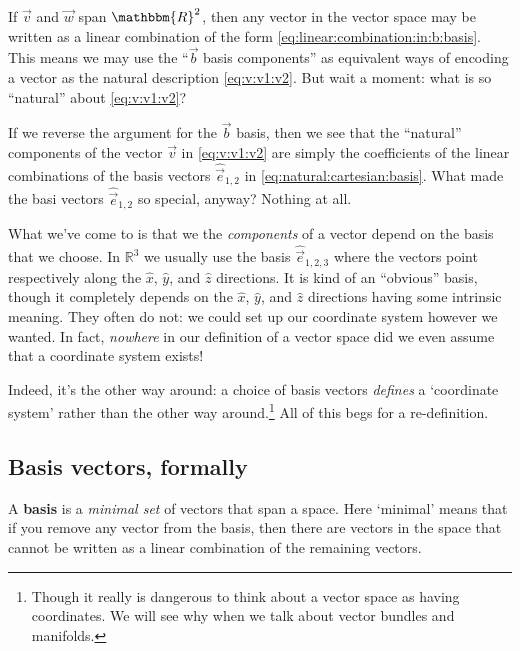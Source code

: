 \documentclass[12pt]{article}
\begin{document}
If $\vec{v}$ and $\vec{w}$ span $\mathbbm{R}^2$, then any vector in the vector space may be written as a linear combination of the form \eqref{eq:linear:combination:in:b:basis}. This means we may use the ``$\vec{b}$ basis components'' as equivalent ways of encoding a vector as the natural description \eqref{eq:v:v1:v2}. But wait a moment: what is so ``natural'' about \eqref{eq:v:v1:v2}? 

If we reverse the argument for the $\vec{b}$ basis, then we see that the ``natural'' components of the vector $\vec{v}$ in \eqref{eq:v:v1:v2} are simply the coefficients of the linear combinations of the basis vectors $\hat{\vec{e}}_{1,2}$ in \eqref{eq:natural:cartesian:basis}. What made the basi vectors $\hat{\vec{e}}_{1,2}$ so special, anyway? Nothing at all. 

What we've come to is that we the \emph{components} of a vector depend on the basis that we choose. In $\mathbb{R}^3$ we usually use the basis $\hat{\vec{e}}_{1,2,3}$ where the vectors point respectively along the $\hat{x}$, $\hat{y}$, and $\hat{z}$ directions. It is kind of an ``obvious'' basis, though it completely depends on the $\hat{x}$, $\hat{y}$, and $\hat{z}$ directions having some intrinsic meaning. They often do not: we could set up our coordinate system however we wanted. In fact, \emph{nowhere} in our definition of a vector space did we even assume that a coordinate system exists!

Indeed, it's the other way around: a choice of basis vectors \emph{defines} a `coordinate system' rather than the other way around.\footnote{Though it really is dangerous to think about a vector space as having coordinates. We will see why when we talk about vector bundles and manifolds.} All of this begs for a re-definition.


\subsection{Basis vectors, formally}

A \textbf{basis} is a \emph{minimal set} of vectors that span a space. Here `minimal' means that if you remove any vector from the basis, then there are vectors in the space that cannot be written as a linear combination of the remaining vectors.
\end{document}

